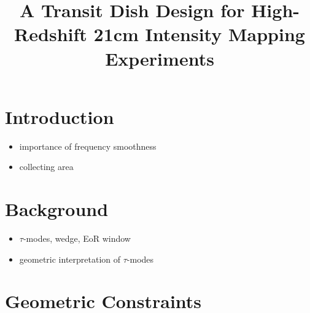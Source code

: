 \documentclass[preprint]{aastex}  %
\begin{document}
\title{A Transit Dish Design for High-Redshift 21cm Intensity Mapping Experiments}

\author{
}


\begin{abstract}
\end{abstract}

\section{Introduction}

\begin{itemize}
\item importance of frequency smoothness
\item collecting area
\end{itemize}

\section{Background}
\label{sec:background}

\begin{itemize}
\item $\tau$-modes, wedge, EoR window
\item geometric interpretation of $\tau$-modes
\end{itemize}

\section{Geometric Constraints}
\label{sec:geometry}
\end{document}
